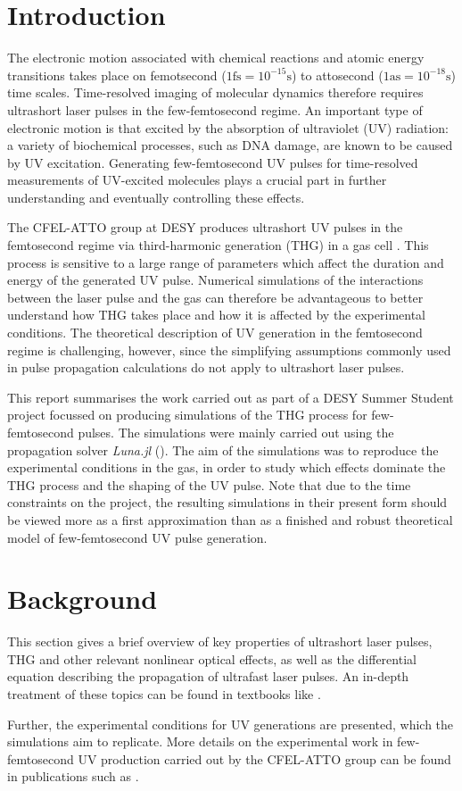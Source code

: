\documentclass[a4paper]{jpconf}
\begin{document}
\section{Introduction}
The electronic motion associated with chemical reactions and atomic energy transitions takes place on femotsecond ($1 \text{fs} = 10^{-15} \text{s}$) to attosecond ($1 \text{as} = 10^{-18} \text{s}$) time scales. Time-resolved imaging of molecular dynamics therefore requires ultrashort laser pulses in the few-femtosecond regime. An important type of electronic motion is that excited by the absorption of ultraviolet (UV) radiation: a variety of biochemical processes, such as DNA damage, are known to be caused by UV excitation. Generating few-femtosecond UV pulses for time-resolved measurements of UV-excited molecules plays a crucial part in further understanding and eventually controlling these effects. \par 
The CFEL-ATTO group at DESY produces ultrashort UV pulses in the femtosecond regime via third-harmonic generation (THG) in a gas cell \cite{galli2019}. This process is sensitive to a large range of parameters which affect the duration and energy of the generated UV pulse. Numerical simulations of the interactions between the laser pulse and the gas can therefore be advantageous to better understand how THG takes place and how it is affected by the experimental conditions. The theoretical description of UV generation in the femtosecond regime is challenging, however, since the simplifying assumptions commonly used in pulse propagation calculations do not apply to ultrashort laser pulses. \par 
This report summarises the work carried out as part of a DESY Summer Student project focussed on producing simulations of the THG process for few-femtosecond pulses. The simulations were mainly carried out using the propagation solver \textit{Luna.jl} (\cite{brahms2023}). The aim of the simulations was to reproduce the experimental conditions in the gas, in order to study which effects dominate the THG process and the shaping of the UV pulse. Note that due to the time constraints on the project, the resulting simulations in their present form should be viewed more as a first approximation than as a finished and robust theoretical model of few-femtosecond UV pulse generation. 

\section{Background}
This section gives a brief overview of key properties of ultrashort laser pulses,  THG and other relevant nonlinear optical effects, as well as the differential equation describing the propagation of ultrafast laser pulses. An in-depth treatment of these topics can be found in textbooks like \cite{keller2021, new2011}. \par 
Further, the experimental conditions for UV generations are presented, which the simulations aim to replicate. More details on the experimental work in few-femtosecond UV production carried out by the CFEL-ATTO group can be found in publications such as \cite{galli2019}. 
\end{document}
